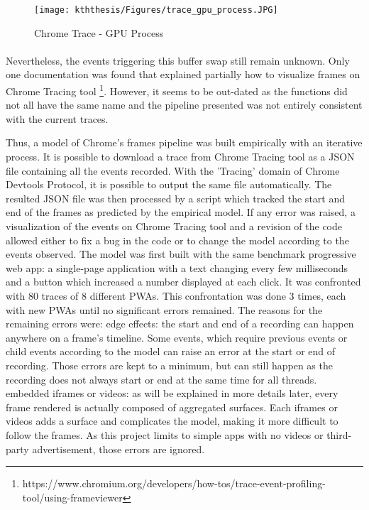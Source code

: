  \begin{figure}[!ht]
     \centering
     \texttt{[image: kththesis/Figures/trace\_gpu\_process.JPG]}
     \caption{Chrome Trace - GPU Process}
     \label{fig:gpu_process}
 \end{figure}
 
\paragraph{}
Nevertheless, the events triggering this buffer swap still remain unknown. Only one documentation was found that explained partially how to visualize frames on Chrome Tracing tool \footnote{https://www.chromium.org/developers/how-tos/trace-event-profiling-tool/using-frameviewer}. However, it seems to be out-dated as the functions did not all have the same name and the pipeline presented was not entirely consistent with the current traces. 


\color{blue}
Thus, a model of Chrome's frames pipeline was built empirically with an iterative process. It is possible to download a trace from Chrome Tracing tool as a JSON file containing all the events recorded. With the 'Tracing' domain of Chrome Devtools Protocol, it is possible to output the same file automatically. The resulted JSON file was then processed by a script which tracked the start and end of the frames as predicted by the empirical model. If any error was raised, a visualization of the events on Chrome Tracing tool and a revision of the code allowed either to fix a bug in the code or to change the model according to the events observed. \newline
The model was first built with the same benchmark progressive web app: a single-page application with a text changing every few milliseconds and a button which increased a number displayed at each click. It was confronted with 80 traces of 8 different PWAs. This confrontation was done 3 times, each with new PWAs until no significant errors remained. The reasons for the remaining errors were: \newline
\textendash  edge effects: the start and end of a recording can happen anywhere on a frame's timeline. Some events, which require previous events or child events according to the model can raise an error at the start or end of recording. Those errors are kept to a minimum, but can still happen as the recording does not always start or end at the same time for all threads. \newline
\textendash  embedded iframes or videos: as will be explained in more details later, every frame rendered is actually composed of aggregated surfaces. Each iframes or videos adds a surface and complicates the model, making it more difficult to follow the frames. As this project limits to simple apps with no videos or third-party advertisement, those errors are ignored. 

